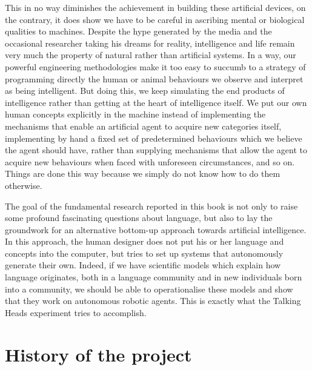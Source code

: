 This in no way diminishes the achievement in
building these artificial devices, on the contrary, it
does show we have to be careful in ascribing mental or biological
qualities to machines. Despite the hype generated by the
media and the occasional researcher taking his dreams for reality, 
intelligence and life remain very much the property of
natural rather than artificial systems. In a way, our
powerful engineering methodologies make it too easy to 
succumb to a strategy of programming directly the human or animal 
behaviours we observe and interpret as being 
intelligent. But doing this, we keep simulating 
the end products of intelligence rather than getting at the heart of 
intelligence itself. We put our own human concepts explicitly
in the machine instead of implementing the mechanisms that
enable an artificial agent to acquire new categories itself, 
implementing by hand a fixed set of predetermined behaviours which 
we believe the agent should have, 
rather than supplying mechanisms that allow the agent to acquire new 
behaviours when faced with unforeseen circumstances, 
and so on. Things are done this way because we simply 
do not know how to do them otherwise. 

The goal of the fundamental research
reported in this book is not only to raise some 
profound fascinating questions about language, but also to lay 
the groundwork for an alternative bottom-up approach towards
artificial intelligence. In this approach, the human 
designer does not put his or her language and 
concepts into the computer, but tries to set up systems that
autonomously generate their own. Indeed, if we have scientific
models which explain how language originates, both in a language
community and in new individuals born 
into a community, we should be able to operationalise 
these models and show that they work on autonomous robotic
agents. This is exactly what the Talking Heads experiment
tries to accomplish. 

\section{History of the project}

